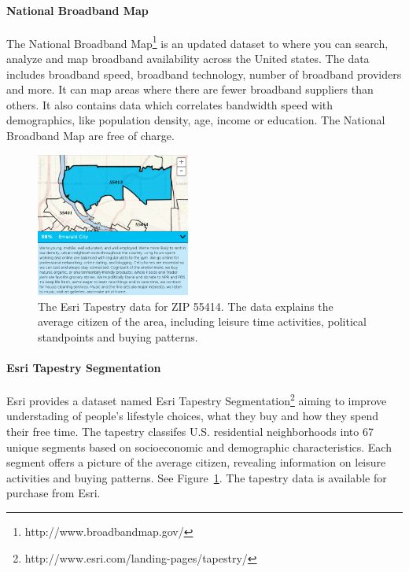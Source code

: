 \documentclass[twocolumn]{article}
\begin{document}
\paragraph{National Broadband Map}
\label{par:National Broadband Map}
The National Broadband Map\footnote{http://www.broadbandmap.gov/} is an updated dataset to where you can search, analyze and map broadband availability across the United states. The data includes broadband speed, broadband technology, number of broadband providers and more. It can map areas where there are fewer broadband suppliers than others. It also contains data which correlates bandwidth speed with demographics, like population density, age, income or education. The National Broadband Map are free of charge.

\begin{figure}
  \centering
  \includegraphics[width=0.45\textwidth]{img/tapestry.png}
  \caption{The Esri Tapestry data for ZIP 55414. The data explains the average citizen of the area, including leisure time activities, political standpoints and buying patterns.}
  \label{fig:tapestry}
\end{figure}
\paragraph{Esri Tapestry Segmentation}
\label{par:Esri Tapestry Segmentation}
Esri provides a dataset named Esri Tapestry Segmentation\footnote{http://www.esri.com/landing-pages/tapestry/} aiming to improve understading of people's lifestyle choices, what they buy and how they spend their free time. The tapestry classifes U.S. residential neighborhoods into 67 unique segments based on socioeconomic and demographic characteristics. Each segment offers a picture of the average citizen, revealing information on leisure activities and buying patterns. See Figure~\ref{fig:tapestry}. The tapestry data is available for purchase from Esri.
\end{document}
